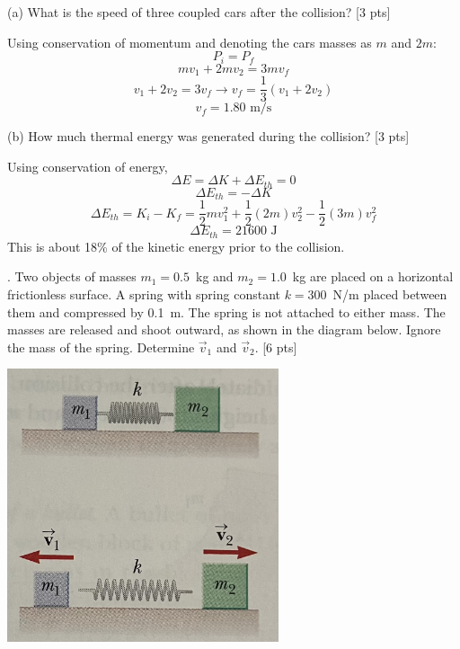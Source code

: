 \documentclass[11pt,letterpaper]{article}
\newcommand{\sol}[1]{{\color{White} #1}} %
\begin{document}
(a) What is the speed of three coupled cars after the collision? [3 pts]

\sol{Using conservation of momentum and denoting the cars masses as $m$ and $2m$:
$$P_i = P_f$$
$$mv_1 + 2mv_2 = 3mv_f$$
$$v_1+2v_2 = 3v_f \rightarrow v_f = \frac{1}{3}(v_1+2v_2)$$
$$\boxed{v_f = 1.80 \mbox{ m/s}}$$ 
}

\vspace{2cm}
(b) How much thermal energy was generated during the collision? [3 pts]

\sol{Using conservation of energy,
$$\Delta E = \Delta K + \Delta E_{th} = 0$$
$$\Delta E_{th} = -\Delta K$$
$$\Delta E_{th} = K_i - K_f = \frac{1}{2}mv_1^2 + \frac{1}{2}(2m)v_2^2 - \frac{1}{2}(3m)v_f^2$$
$$\boxed{\Delta E_{th} = 21600\mbox{ J}}$$
This is about 18\% of the kinetic energy prior to the collision.

}




. Two objects of masses $m_1=0.5$~kg and $m_2=1.0$~kg are placed on a horizontal frictionless surface. A spring with spring constant $k=300$~N/m placed between them and compressed by 0.1~m. The spring is not attached to either mass. The masses are released and shoot outward, as shown in the diagram below. Ignore the mass of the spring. Determine $\vec{v}_1$ and $\vec{v}_2$. [6 pts]

\includegraphics[width=8cm]{./exam2_4.jpg}
\end{document}
